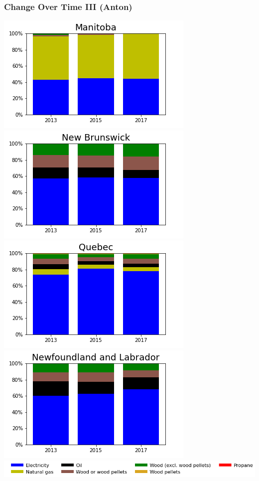 \documentclass{beamer}
\begin{document}
\begin{frame}
\frametitle{Change Over Time III (Anton)}
\vspace{-10pt}
\begin{center}
\includegraphics[width=0.48\linewidth]{mn.png}%
\includegraphics[width=0.48\linewidth]{nb.png}\\
\includegraphics[width=0.48\linewidth]{qc.png}%
\includegraphics[width=0.48\linewidth]{nl.png}\\
\includegraphics[width=0.9\linewidth]{leg_bar.png}
\end{center}
\end{frame}
\end{document}
